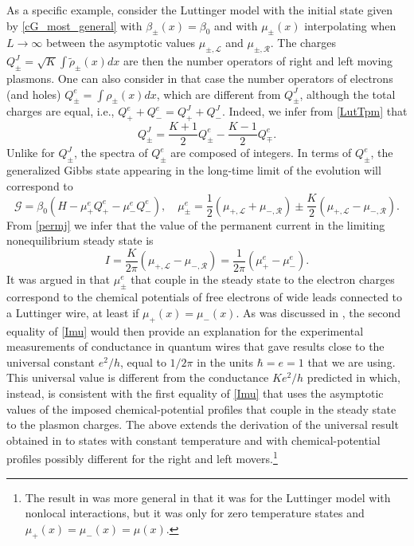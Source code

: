\documentclass[12pt,a4paper]{article}
\newcommand{\cG}{\mathcal{G}}
\newcommand{\cL}{\mathcal{L}}
\newcommand{\cR}{\mathcal{R}}
\theoremstyle{definition}
\theoremstyle{remark}
\begin{document}
As a specific example, consider the Luttinger model with the initial state
given by  \eqref{cG_most_general} with $\beta_{\pm}(x) = \beta_{0}$ and with 
$\mu_{\pm}(x)$ interpolating when $L\to\infty$ between the asymptotic
values $\mu_{\pm,\cL}$ and $\mu_{\pm,\cR}$. The charges $Q^{J}_{\pm}=\sqrt{K}
\int\tilde\rho_\pm(x)dx$ are then
the number operators of right and 
left moving plasmons. One can also consider in that case the number operators of electrons (and holes) $Q^{e}_{\pm} =\int \rho_{\pm}(x) dx$, which are different from $Q^{J}_{\pm}$, although the total charges are equal, i.e., $Q^{e}_{+}
+ Q^{e}_{-} = Q^{J}_{+} + Q^{J}_{-}$. Indeed, we infer from \eqref{LutTpm} that
\begin{equation}
Q^J_\pm=\frac{K+1}{2}Q^{e}_\pm-\frac{K-1}{2}Q^{e}_\mp.
\end{equation}
Unlike for $Q^{J}_{\pm}$, the spectra of $Q^{e}_{\pm}$ are composed of integers.
In terms of $Q^{e}_{\pm}$, the generalized Gibbs state appearing in the long-time limit of the evolution will correspond to
%
\begin{equation}
\cG
= \beta_0(H -\mu^{e}_{+}Q^{e}_{+}- \mu^{e}_{-}Q^{e}_{-} ),
\quad
\mu^{e}_{\pm}
= \frac{1}{2} (\mu_{+,\cL} + \mu_{-,\cR})\pm \frac{K}{2} (\mu_{+,\cL} - \mu_{-,\cR}).
\end{equation}
%
From \eqref{permj} we infer that the value of the permanent 
current in the limiting nonequilibrium steady state is
%
\begin{equation}
\label{Imu}  
I
= \frac{K}{2\pi} \left( \mu_{+,\cL} - \mu_{-,\cR} \right)
= \frac{1}{2\pi} \left( \mu^{e}_{+} - \mu^{e}_{-} \right).
\end{equation}
%
It was argued in \cite{MS,ACF,Kaw} that $\mu^{e}_{\pm}$ that couple in the
steady state to the electron charges correspond
to the chemical potentials of free electrons of wide leads connected
to a Luttinger wire, at least if $\mu_+(x)=\mu_-(x)$. As was discussed in
\cite{LLMM1}, the second equality of \eqref{Imu} would then provide an
explanation for the experimental measurements \cite{THS} of conductance in
quantum wires that gave results close to the universal constant ${e^2}/{h}$,
equal to ${1}/{2\pi}$ in the units $\hbar = e = 1$ that we are using.
This universal value is different from the conductance ${K e^2}/{h}$ 
predicted in \cite{FK} which, instead, is consistent with
the first equality of \eqref{Imu} that uses the asymptotic values of the
imposed chemical-potential profiles that couple in the steady
state to the plasmon charges.  
The above extends the derivation of the universal result obtained in \cite{LLMM1} to states with constant temperature and with chemical-potential profiles 
possibly different for the right and left movers.\footnote{The result in \cite{LLMM1} was more general in that it was for the Luttinger model with nonlocal interactions, but it was only for zero temperature states and $\mu_+(x)=\mu_-(x)=\mu(x)$.}
\end{document}
